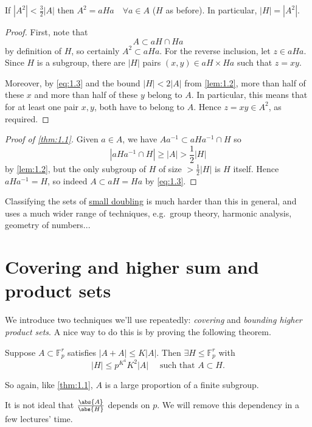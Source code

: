 \documentclass{article}
\newcommand{\ratio}[2]{\frac{\abs{#1}}{\abs{#2}}}
\numberwithin{equation}{section}
\begin{document}
\begin{nlemma}
  If $|A^2| < \frac{3}{2} |A|$ then $A^2 = a H a \quad \forall a \in A$ ($H$ as before). In particular, $|H| = |A^2|$.
\end{nlemma}
\begin{proof}
  First, note that
  \begin{equation}
    A \subset aH \cap Ha \label{eq:1.3}
  \end{equation}
  by definition of $H$, so certainly $A^2 \subset a Ha$. For the reverse inclusion, let $z \in a H a$.
  Since $H$ is a subgroup, there are $|H|$ pairs $(x,y) \in aH \times Ha$ such that $z = xy$.

  Moreover, by \eqref{eq:1.3} and the bound $|H| < 2|A|$ from \cref{lem:1.2}, more than half of these $x$ and more than half of these $y$ belong to $A$.
  In particular, this means that for at least one pair $x,y$, both have to belong to $A$.
  Hence $z = xy \in A^2$, as required.
\end{proof}
\begin{proof}[Proof of \cref{thm:1.1}]
  Given $a \in A$, we have $A a^{-1} \subset a H a^{-1} \cap H$ so
  \begin{equation*}|a H a^{-1} \cap H| \geq |A| > \frac{1}{2} |H|\end{equation*}
  by \cref{lem:1.2}, but the only subgroup of $H$ of size $> \frac{1}{2}|H|$ is $H$ itself.
  Hence $a H a^{-1} = H$, so indeed $A \subset a H = Ha$ by \eqref{eq:1.3}.
\end{proof}
Classifying the sets of \hyperlink{def:doubling}{small doubling} is much harder than this in general, and uses a much wider range of techniques, e.g.\ group theory, harmonic analysis, geometry of numbers...

\section{Covering and higher sum and product sets}
We introduce two techniques we'll use repeatedly: \emph{covering} and \emph{bounding higher product sets}.
A nice way to do this is by proving the following theorem.
\begin{nthm}[Rusza]\label{thm:2.1}
  Suppose $A \subset \mathbb{F}_p^r$ satisfies $|A+A| \leq K|A|$. Then $\exists H \leq \mathbb{F}_p^r$ with
  \begin{equation*}
    |H| \leq p^{K^4} K^2 |A| \quad \text{ such that } A \subset H.
  \end{equation*}
\end{nthm}
So again, like \cref{thm:1.1}, $A$ is a large proportion of a finite subgroup.
\begin{remark}
  It is not ideal that $\ratio{A}{H}$ depends on $p$. We will remove this dependency in a few lectures' time.
\end{remark}
\end{document}
